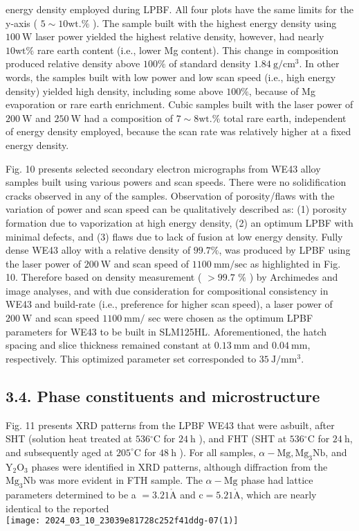 \documentclass[10pt]{article}
\def\AA{\mathring{\mathrm{A}}}
\begin{document}
energy density employed during LPBF. All four plots have the same limits for the y-axis ( $5 \sim 10 \mathrm{wt} . \%$ ). The sample built with the highest energy density using $100 \mathrm{~W}$ laser power yielded the highest relative density, however, had nearly $10 \mathrm{wt} \%$ rare earth content (i.e., lower Mg content). This change in composition produced relative density above $100 \%$ of standard density $1.84 \mathrm{~g} / \mathrm{cm}^{3}$. In other words, the samples built with low power and low scan speed (i.e., high energy density) yielded high density, including some above $100 \%$, because of Mg evaporation or rare earth enrichment. Cubic samples built with the laser power of $200 \mathrm{~W}$ and $250 \mathrm{~W}$ had a composition of $7 \sim 8 \mathrm{wt} . \%$ total rare earth, independent of energy density employed, because the scan rate was relatively higher at a fixed energy density.

Fig. 10 presents selected secondary electron micrographs from WE43 alloy samples built using various powers and scan speeds. There were no solidification cracks observed in any of the samples. Observation of porosity/flaws with the variation of power and scan speed can be qualitatively described as: (1) porosity formation due to vaporization at high energy density, (2) an optimum LPBF with minimal defects, and (3) flaws due to lack of fusion at low energy density. Fully dense WE43 alloy with a relative density of $99.7 \%$, was produced by LPBF using the laser power of $200 \mathrm{~W}$ and scan speed of $1100 \mathrm{~mm} / \mathrm{sec}$ as highlighted in Fig. 10. Therefore based on density measurement ( $>99.7$ $\%$ ) by Archimedes and image analyses, and with due consideration for compositional consistency in WE43 and build-rate (i.e., preference for higher scan speed), a laser power of $200 \mathrm{~W}$ and scan speed $1100 \mathrm{~mm} /$ sec were chosen as the optimum LPBF parameters for WE43 to be built in SLM125HL. Aforementioned, the hatch spacing and slice thickness remained constant at $0.13 \mathrm{~mm}$ and $0.04 \mathrm{~mm}$, respectively. This optimized parameter set corresponded to $35 \mathrm{~J} / \mathrm{mm}^{3}$.

\subsection*{3.4. Phase constituents and microstructure}
Fig. 11 presents XRD patterns from the LPBF WE43 that were asbuilt, after SHT (solution heat treated at $536{ }^{\circ} \mathrm{C}$ for $24 \mathrm{~h}$ ), and FHT (SHT at $536{ }^{\circ} \mathrm{C}$ for $24 \mathrm{~h}$, and subsequently aged at $205^{\circ} \mathrm{C}$ for $48 \mathrm{~h}$ ). For all samples, $\alpha-\mathrm{Mg}, \mathrm{Mg}_{3} \mathrm{Nb}$, and $\mathrm{Y}_{2} \mathrm{O}_{3}$ phases were identified in XRD patterns, although diffraction from the $\mathrm{Mg}_{3} \mathrm{Nb}$ was more evident in FTH sample. The $\alpha-\mathrm{Mg}$ phase had lattice parameters determined to be a $=3.21 \AA$ and $\mathrm{c}=5.21 \AA$, which are nearly identical to the reported\\
\texttt{[image: 2024\_03\_10\_23039e81728c252f41ddg-07(1)]}
\end{document}
